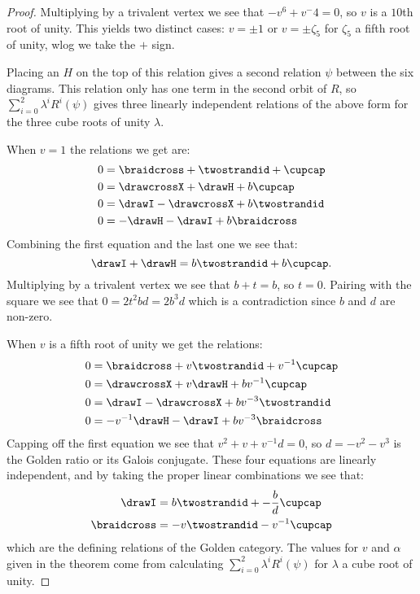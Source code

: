 \documentclass[12pt]{amsart}
\begin{document}
\begin{proof}
Multiplying by a trivalent vertex we see that $-v^6+v^-4=0$, so $v$ is a
$10$th root of unity.  This yields two distinct cases: $v= \pm 1$ or $v = \pm
\zeta_5$ for $\zeta_5$ a fifth root of unity, wlog we take the $+$ sign.

Placing an $H$ on the top of this relation gives a second relation $\psi$
between the six diagrams.  This relation only has one term in the second orbit
of $R$, so $\sum_{i=0}^2 \lambda^i R^i(\psi)$ gives three linearly independent
relations of the above form for the three cube roots of unity $\lambda$.

When $v=1$ the relations we get are:
\begin{align*}
0 &= \braidcross + \twostrandid + \cupcap \\
0 &= \drawcrossX +\drawH + b\cupcap \\
0 &= \drawI - \drawcrossX + b\twostrandid \\
0 &= -\drawH -\drawI + b \braidcross
\end{align*}
Combining the first equation and the last one we see that:
$$\drawI+\drawH = b \twostrandid + b\cupcap.$$
Multiplying by a trivalent vertex we see that $b+t=b$, so $t = 0$.  Pairing
with the square we see that $0 = 2t^2 bd = 2b^3 d$ which is a contradiction
since $b$ and $d$ are non-zero.

When $v$ is a fifth root of unity we get the relations:
\begin{align*}
0 &= \braidcross + v\twostrandid + v^{-1}\cupcap \\
0 &= \drawcrossX +v \drawH + b v^{-1}\cupcap \\
0 &= \drawI - \drawcrossX + b v^{-3} \twostrandid \\
0 &= -v^{-1} \drawH -\drawI + b v^{-3} \braidcross
\end{align*}
Capping off the first equation we see that $v^2 + v +v^{-1}d = 0$, so $d =
-v^2-v^3$ is the Golden ratio or its Galois conjugate.  These four equations
are linearly independent, and by taking the proper linear combinations we see
that:
\begin{align*}
\drawI &=  b\twostrandid + -\frac{b}{d} \cupcap \\
\braidcross &= -v\twostrandid -v^{-1} \cupcap \\
\end{align*}
which are the defining relations of the Golden category.  The values for $v$ and $\alpha$ given in the theorem come from calculating $\sum_{i=0}^2 \lambda^i R^i(\psi)$ for $\lambda$ a cube root of unity.
\end{proof}
\end{document}
